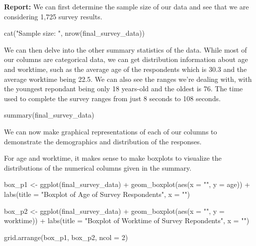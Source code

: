 \documentclass[
]{article}
\newenvironment{Shaded}{\begin{snugshade}}{\end{snugshade}}
\newcommand{\AttributeTok}[1]{\textcolor[rgb]{0.77,0.63,0.00}{#1}}
\newcommand{\DecValTok}[1]{\textcolor[rgb]{0.00,0.00,0.81}{#1}}
\newcommand{\FunctionTok}[1]{\textcolor[rgb]{0.00,0.00,0.00}{#1}}
\newcommand{\NormalTok}[1]{#1}
\newcommand{\OtherTok}[1]{\textcolor[rgb]{0.56,0.35,0.01}{#1}}
\newcommand{\SpecialCharTok}[1]{\textcolor[rgb]{0.00,0.00,0.00}{#1}}
\newcommand{\StringTok}[1]{\textcolor[rgb]{0.31,0.60,0.02}{#1}}
\begin{document}
\textbf{Report:} We can first determine the sample size of our data and
see that we are considering 1,725 survey results.

\begin{Shaded}
\begin{Highlighting}[]
\FunctionTok{cat}\NormalTok{(}\StringTok{"Sample size: "}\NormalTok{, }\FunctionTok{nrow}\NormalTok{(final\_survey\_data))}
\end{Highlighting}
\end{Shaded}

We can then delve into the other summary statistics of the data. While
most of our columns are categorical data, we can get distribution
information about age and worktime, such as the average age of the
respondents which is 30.3 and the average worktime being 22.5. We can
also see the ranges we're dealing with, with the youngest repondant
being only 18 years-old and the oldest is 76. The time used to complete
the survey ranges from just 8 seconds to 108 seconds.

\begin{Shaded}
\begin{Highlighting}[]
\FunctionTok{summary}\NormalTok{(final\_survey\_data)}
\end{Highlighting}
\end{Shaded}

We can now make graphical representations of each of our columns to
demonstrate the demographics and distribution of the responses.

For age and worktime, it makes sense to make boxplots to visualize the
distributions of the numerical columns given in the summary.

\begin{Shaded}
\begin{Highlighting}[]
\NormalTok{box\_p1 }\OtherTok{\textless{}{-}} \FunctionTok{ggplot}\NormalTok{(final\_survey\_data) }\SpecialCharTok{+} 
  \FunctionTok{geom\_boxplot}\NormalTok{(}\FunctionTok{aes}\NormalTok{(}\AttributeTok{x =} \StringTok{""}\NormalTok{, }\AttributeTok{y =}\NormalTok{ age)) }\SpecialCharTok{+} 
  \FunctionTok{labs}\NormalTok{(}\AttributeTok{title =} \StringTok{"Boxplot of Age of Survey Respondents"}\NormalTok{, }\AttributeTok{x =} \StringTok{""}\NormalTok{) }

\NormalTok{box\_p2 }\OtherTok{\textless{}{-}} \FunctionTok{ggplot}\NormalTok{(final\_survey\_data) }\SpecialCharTok{+}
  \FunctionTok{geom\_boxplot}\NormalTok{(}\FunctionTok{aes}\NormalTok{(}\AttributeTok{x =} \StringTok{""}\NormalTok{, }\AttributeTok{y =}\NormalTok{ worktime)) }\SpecialCharTok{+}
  \FunctionTok{labs}\NormalTok{(}\AttributeTok{title =} \StringTok{"Boxplot of Worktime of Survey Repondents"}\NormalTok{, }\AttributeTok{x =} \StringTok{""}\NormalTok{)}

\FunctionTok{grid.arrange}\NormalTok{(box\_p1, box\_p2, }\AttributeTok{ncol =} \DecValTok{2}\NormalTok{)}
\end{Highlighting}
\end{Shaded}
\end{document}
